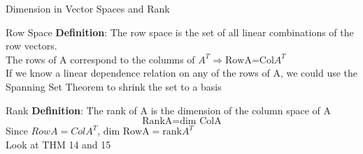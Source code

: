 \documentclass[a4paper, 12pt]{article}
\begin{document}
\begin{section}{Dimension in Vector Spaces and Rank}
\begin{subsection}{Row Space}
\textbf{Definition}: The row space is the set of all linear combinations of the
row vectors.\\
The rows of A correspond to the columns of $A^{T} \Rightarrow \mbox{RowA=Col}A^{T}$
\\ If we know a linear dependence relation on any of the rows of A, we could use
the Spanning Set Theorem to shrink the set to a basis
\end{subsection}
\begin{subsection}{Rank}
\textbf{Definition}: The rank of A is the dimension of the column space of A
\begin{equation}
\mbox{RankA}=\mbox{dim ColA}
\end{equation}
Since $RowA=ColA^{T}$, $\mbox{dim RowA}=\mbox{rank}A^{T}$ \\
Look at THM 14 and 15
\end{subsection}
\end{section}
\newpage
\end{document}
